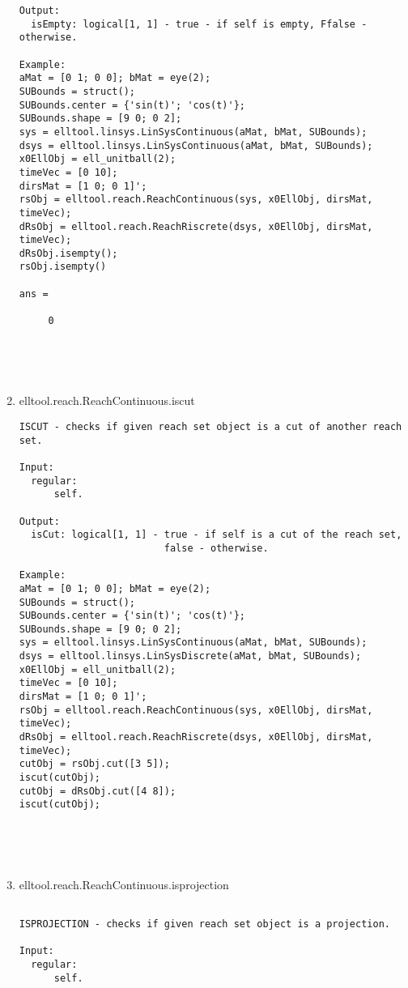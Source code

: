 \begin{enumerate}
\begin{lstlisting}
Output:
  isEmpty: logical[1, 1] - true - if self is empty, Ffalse - otherwise.

Example:
aMat = [0 1; 0 0]; bMat = eye(2);
SUBounds = struct();
SUBounds.center = {'sin(t)'; 'cos(t)'};
SUBounds.shape = [9 0; 0 2];
sys = elltool.linsys.LinSysContinuous(aMat, bMat, SUBounds);
dsys = elltool.linsys.LinSysContinuous(aMat, bMat, SUBounds);
x0EllObj = ell_unitball(2);
timeVec = [0 10];
dirsMat = [1 0; 0 1]';
rsObj = elltool.reach.ReachContinuous(sys, x0EllObj, dirsMat, timeVec);
dRsObj = elltool.reach.ReachRiscrete(dsys, x0EllObj, dirsMat, timeVec);
dRsObj.isempty();
rsObj.isempty()

ans =

     0





\end{lstlisting}
\fontfamily{\familydefault}
\selectfont
\item {elltool.reach.ReachContinuous.iscut}
\selectfont
\begin{lstlisting}
ISCUT - checks if given reach set object is a cut of another reach set.

Input:
  regular:
      self.

Output:
  isCut: logical[1, 1] - true - if self is a cut of the reach set,
                         false - otherwise.

Example:
aMat = [0 1; 0 0]; bMat = eye(2);
SUBounds = struct();
SUBounds.center = {'sin(t)'; 'cos(t)'};
SUBounds.shape = [9 0; 0 2];
sys = elltool.linsys.LinSysContinuous(aMat, bMat, SUBounds);
dsys = elltool.linsys.LinSysDiscrete(aMat, bMat, SUBounds);
x0EllObj = ell_unitball(2);
timeVec = [0 10];
dirsMat = [1 0; 0 1]';
rsObj = elltool.reach.ReachContinuous(sys, x0EllObj, dirsMat, timeVec);
dRsObj = elltool.reach.ReachRiscrete(dsys, x0EllObj, dirsMat, timeVec);
cutObj = rsObj.cut([3 5]);
iscut(cutObj);
cutObj = dRsObj.cut([4 8]);
iscut(cutObj);





\end{lstlisting}
\fontfamily{\familydefault}
\selectfont
\item {elltool.reach.ReachContinuous.isprojection}
\selectfont
\begin{lstlisting}

ISPROJECTION - checks if given reach set object is a projection.

Input:
  regular:
      self.


\end{lstlisting}
\end{enumerate}
